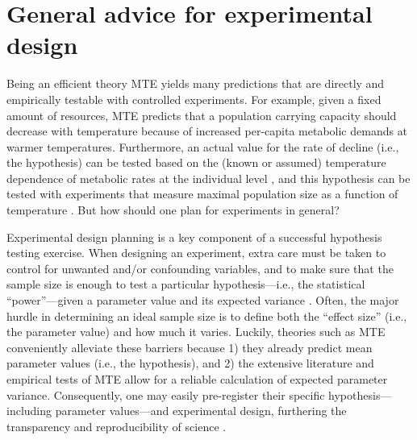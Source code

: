 \documentclass[a4paper,12pt]{article}
\begin{document}
\section{General advice for experimental design}

Being an efficient theory \citep{marquet2014bioscience} MTE yields many predictions that are directly and empirically testable with controlled experiments. For example, given a fixed amount of resources, MTE predicts that a population carrying capacity should decrease with temperature because of increased per-capita metabolic demands \citep{brown2004ecology, savage2004amnat, barneche2016procb} at warmer temperatures. Furthermore, an actual value for the rate of decline (i.e., the hypothesis) can be tested based on the (known or assumed) temperature dependence of metabolic rates at the individual level \citep[see e.g.,][]{savage2004amnat}, and this hypothesis can be tested with experiments that measure maximal population size as a function of temperature \citep[see e.g.,][and many more examples in the chapter \textbf{``Experimental Approaches in Metabolic Scaling Theory''}]{bernhardt2018amnat, bernhardt2018procb}. But how should one plan for experiments in general?

Experimental design planning is a key component of a successful hypothesis testing exercise. When designing an experiment, extra care must be taken to control for unwanted and/or confounding variables, and to make sure that the sample size is enough to test a particular hypothesis---i.e., the statistical ``power''---given a parameter value and its expected variance \citep{gelman2020book}. Often, the major hurdle in determining an ideal sample size is to define both the ``effect size'' (i.e., the parameter value) and how much it varies. Luckily, theories such as MTE conveniently alleviate these barriers because 1) they already predict mean parameter values (i.e., the hypothesis), and 2) the extensive literature and empirical tests of MTE allow for a reliable calculation of expected parameter variance. Consequently, one may easily pre-register their specific hypothesis---including parameter values---and experimental design, furthering the transparency and reproducibility of science \citep{odea2021bmcbiol}.
\end{document}
